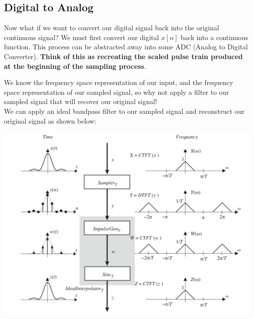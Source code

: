 \documentclass[a4paper]{article}
\numberwithin{equation}{section}
\begin{document}
\subsection{Digital to Analog}
Now what if we want to convert our digital signal back into the original continuous signal? We must first convert our digital $x[n]$ back into a continuous function. This process can be abstracted away into some ADC (Analog to Digital Converter). \textbf{Think of this as recreating the scaled pulse train produced at the beginning of the sampling process}. 

\begin{center}
\end{center}

 We know the frequency space representation of our input, and the frequency space representation of our sampled signal, so why not apply a filter to our sampled signal that will recover our original signal!\\

We can apply an ideal bandpass filter to our sampled signal and reconstruct our original signal as shown below:

\begin{center}
\includegraphics[scale=0.7]{reconstruct.png}
\end{center}
\end{document}

